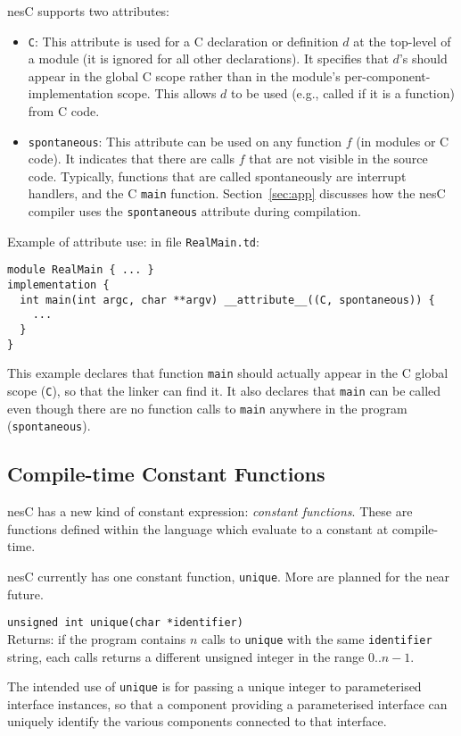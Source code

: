 \documentclass[11pt]{article}
\newcommand{\code}[1]{{\tt #1}}
\newcommand{\file}[1]{{\tt #1}}
\newcommand{\nesc}{nesC\xspace}
\begin{document}
\nesc supports two attributes:
\begin{itemize}
\item \code{C}: This attribute is used for a C declaration or definition
$d$ at the top-level of a module (it is ignored for all other
declarations). It specifies that $d$'s should appear in the global C scope
rather than in the module's per-component-implementation scope. This allows
$d$ to be used (e.g., called if it is a function) from C code.

\item \code{spontaneous}: This attribute can be used on any function
$f$ (in modules or C code). It indicates that there are calls $f$ that
are not visible in the source code. Typically, functions that are
called spontaneously are interrupt handlers, and the C \code{main}
function. Section~\ref{sec:app} discusses how the \nesc compiler
uses the \code{spontaneous} attribute during compilation.
\end{itemize}

Example of attribute use: in file \file{RealMain.td}:
\begin{verbatim}
module RealMain { ... }
implementation {
  int main(int argc, char **argv) __attribute__((C, spontaneous)) {
    ...
  }
}
\end{verbatim}

This example declares that function \code{main} should actually appear
in the C global scope (\code{C}), so that the linker can find it. It
also declares that \code{main} can be called even though there are no
function calls to \code{main} anywhere in the program
(\code{spontaneous}). 

\subsection{Compile-time Constant Functions}

\nesc has a new kind of constant expression: \emph{constant
functions}. These are functions defined within the language which
evaluate to a constant at compile-time.

\nesc currently has one constant function, \code{unique}. More are planned
for the near future.

\code{unsigned int unique(char *identifier)} \\ Returns: if the program
contains $n$ calls to \code{unique} with the same \code{identifier}
string, each calls returns a different unsigned integer in the range
$0 .. n-1$.

The intended use of \code{unique} is for passing a unique integer
to parameterised interface instances, so that a component providing
a parameterised interface can uniquely identify the various components
connected to that interface.
\end{document}
